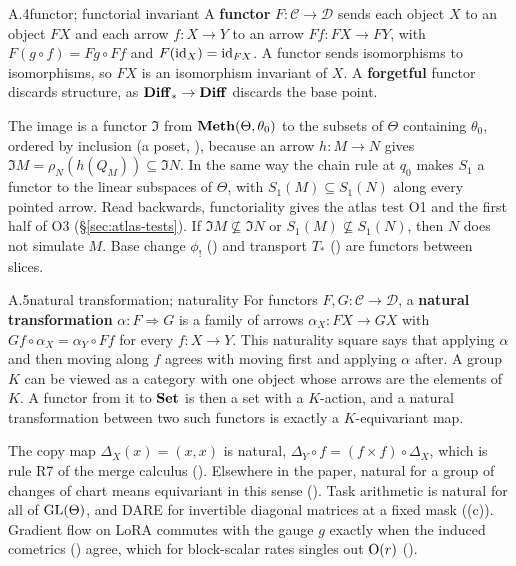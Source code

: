 
\begin{bgentry}{A.4}{functor; functorial invariant}
A \textbf{functor} $F:\mathcal C\to\mathcal D$ sends each object $X$ to an object $FX$ and each arrow $f:X\to Y$ to an
arrow $Ff:FX\to FY$, with $F(g\circ f)=Fg\circ Ff$ and $F(\mathrm{id}_X)=\mathrm{id}_{FX}$. A functor sends isomorphisms to
isomorphisms, so $FX$ is an isomorphism invariant of $X$. A \textbf{forgetful} functor discards structure, as
$\mathbf{Diff}_*\to\mathbf{Diff}$ discards the base point.
\end{bgentry}

The image is a functor $\Im$ from $\mathbf{Meth}(\Theta,\theta_0)$ to the subsets of $\Theta$ containing $\theta_0$, ordered by
inclusion (a poset, ), because an arrow $h:M\to N$ gives $\Im M=\rho_N(h(Q_M))\subseteq\Im N$. In the same
way the chain rule at $q_0$ makes $S_1$ a functor to the linear subspaces of $\Theta$, with $S_1(M)\subseteq S_1(N)$
along every pointed arrow. Read backwards, functoriality gives the atlas test O1 and the first half of O3
(\S\ref{sec:atlas-tests}). If $\Im M\not\subseteq\Im N$ or $S_1(M)\not\subseteq S_1(N)$, then $N$ does not simulate
$M$. Base change $\phi_!$ () and transport $T_*$ () are functors between slices.


\begin{bgentry}{A.5}{natural transformation; naturality}
For functors $F,G:\mathcal C\to\mathcal D$, a \textbf{natural transformation} $\alpha:F\Rightarrow G$ is a family of
arrows $\alpha_X:FX\to GX$ with $Gf\circ\alpha_X=\alpha_Y\circ Ff$ for every $f:X\to Y$. This naturality square says that
applying $\alpha$ and then moving along $f$ agrees with moving first and applying $\alpha$ after. A group $K$ can be
viewed as a category with one object whose arrows are the elements of $K$. A functor from it to $\mathbf{Set}$ is then a set
with a $K$-action, and a natural transformation between two such functors is exactly a $K$-equivariant map.
\end{bgentry}

The copy map $\Delta_X(x)=(x,x)$ is natural, $\Delta_Y\circ f=(f\times f)\circ\Delta_X$, which is rule R7 of the merge
calculus (). Elsewhere in the paper, natural for a group of changes of chart means equivariant in this sense
(). Task arithmetic \citep{ilharco2022editing} is natural for all of $\mathrm{GL}(\Theta)$, and DARE
\citep{yu2023language} for invertible diagonal matrices at a fixed mask ((c)). Gradient flow
on LoRA commutes with the gauge $g$ exactly when the induced cometrics () agree, which for block-scalar rates
singles out $\mathrm{O}(r)$ ().

